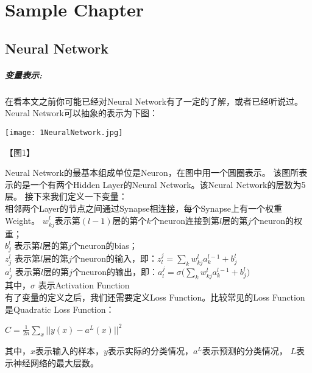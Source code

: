 \documentclass[a4paper,12pt,oneside]{book}
\begin{document}
\chapter{Sample Chapter}

\section{Neural Network}
\paragraph{变量表示:}
在看本文之前你可能已经对Neural Network有了一定的了解，或者已经听说过。Neural Network可以抽象的表示为下图：\\
\begin{center}
    \texttt{[image: 1NeuralNetwork.jpg]}\\
\end{center}
\begin{center}
    【图1】\\
\end{center} 
Neural Network的最基本组成单位是Neuron，在图中用一个圆圈表示。
该图所表示的是一个有两个Hidden Layer的Neural Network。该Neural Network的层数为5层。
接下来我们定义一下变量：\\
相邻两个Layer的节点之间通过Synapse相连接，每个Synapse上有一个权重Weight。
$w_{kj}^l$表示第$(l-1)$层的第个$k$个neuron连接到第$l$层的第$j$个neuron的权重；\\
$b_j^l$ 表示第$l$层的第$j$个neuron的bias；\\
$z_j^l$ 表示第$l$层的第$j$个neuron的输入，即：$z_l^j=\sum_k {w_{kj}^l a^{l-1}_k+b^l_j}$ \\
$a_j^l$ 表示第$l$层的第$j$个neuron的输出，即：$a^j_l=\sigma(\sum_k {w_{kj}^l a^{l-1}_k+b_j^l)}$ \\
其中，$\sigma$ 表示Activation Function\\
有了变量的定义之后，我们还需要定义Loss Function。比较常见的Loss Function是Quadratic Loss Function：\\
\begin{center}
    $C = \frac{1}{2n}\sum_x {||y(x) - a^L(x)||^2}$\\
\end{center}
其中，$x$表示输入的样本，$y$表示实际的分类情况，$a^L$表示预测的分类情况，
$L$表示神经网络的最大层数。\\
\end{document}

